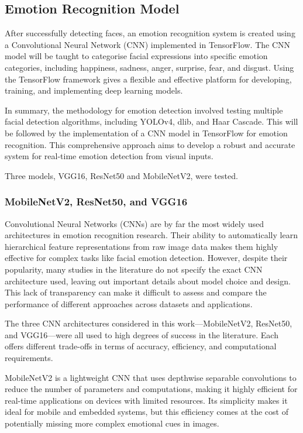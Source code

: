\subsection{Emotion Recognition Model}

After successfully detecting faces, an emotion recognition system is created using a Convolutional Neural Network (CNN) implemented in TensorFlow. The CNN model will be taught to categorise facial expressions into specific emotion categories, including happiness, sadness, anger, surprise, fear, and disgust. Using the TensorFlow framework gives a flexible and effective platform for developing, training, and implementing deep learning models.

In summary, the methodology for emotion detection involved testing multiple facial detection algorithms, including YOLOv4, dlib, and Haar Cascade. This will be followed by the implementation of a CNN model in TensorFlow for emotion recognition. This comprehensive approach aims to develop a robust and accurate system for real-time emotion detection from visual inputs.

Three models, VGG16, ResNet50 and MobileNetV2, were tested.

\subsubsection{MobileNetV2, ResNet50, and VGG16}

Convolutional Neural Networks (CNNs) are by far the most widely used architectures in emotion recognition research. Their ability to automatically learn hierarchical feature representations from raw image data makes them highly effective for complex tasks like facial emotion detection. However, despite their popularity, many studies in the literature do not specify the exact CNN architecture used, leaving out important details about model choice and design. This lack of transparency can make it difficult to assess and compare the performance of different approaches across datasets and applications.

The three CNN architectures considered in this work—MobileNetV2, ResNet50, and VGG16—were all used to high degrees of success in the literature. Each offers different trade-offs in terms of accuracy, efficiency, and computational requirements.

MobileNetV2 is a lightweight CNN that uses depthwise separable convolutions to reduce the number of parameters and computations, making it highly efficient for real-time applications on devices with limited resources. Its simplicity makes it ideal for mobile and embedded systems, but this efficiency comes at the cost of potentially missing more complex emotional cues in images.

